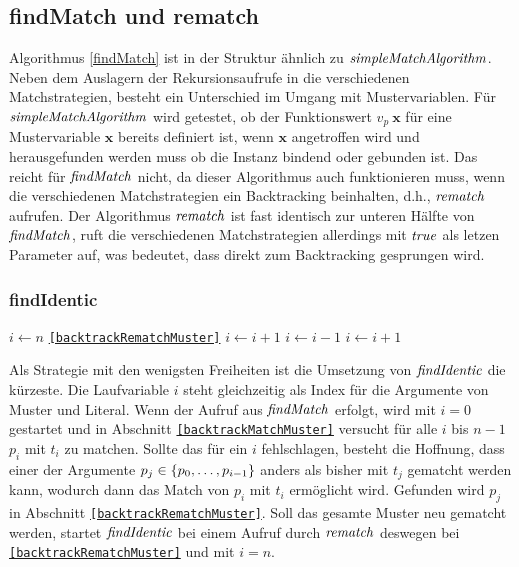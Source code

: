 \subsection{findMatch und rematch}
Algorithmus \ref{findMatch} ist in der Struktur ähnlich zu $\mathit{simpleMatchAlgorithm}$. Neben dem Auslagern der Rekursionsaufrufe in die verschiedenen Matchstrategien, besteht ein Unterschied im Umgang mit Mustervariablen. Für $\mathit{simpleMatchAlgorithm}$ wird getestet, ob der Funktionswert $v_p~\mathbf x$ für eine Mustervariable $\mathbf x$ bereits definiert ist, wenn $\mathbf x$ angetroffen wird und herausgefunden werden muss ob die Instanz bindend oder gebunden ist. Das reicht für $\mathit{findMatch}$ nicht, da dieser Algorithmus auch funktionieren muss, wenn die verschiedenen Matchstrategien ein Backtracking beinhalten, d.h., $\mathit{rematch}$ aufrufen.
Der Algorithmus $\mathit{rematch}$ ist fast identisch zur unteren Hälfte von $\mathit{findMatch}$, ruft die verschiedenen Matchstrategien allerdings mit $\mathit{true}$ als letzen Parameter auf, was bedeutet, dass direkt zum Backtracking gesprungen wird.



\subsubsection {findIdentic}
\begin{algorithm}
\DontPrintSemicolon
\caption{$\Const{findIdentic} \colon M \times T \times \mathit{Bool} \rightarrow \mathit{Bool}$}\label{findIdentic}
\;
 {
	$i \leftarrow n$\;
	\Goto \texttt{\ref{backtrackRematchMuster}}\;
}
\Loop {} {
	 \label{backtrackMatchMuster}
	 {
		$i \leftarrow i + 1$\;
		 {}    
	}
	 \label{backtrackRematchMuster}
	 { 
		 {}
		$i \leftarrow i - 1$\;
	}    
	$i \leftarrow i + 1$\;
}
\end{algorithm}


Als Strategie mit den wenigsten Freiheiten ist die Umsetzung von $\mathit{findIdentic}$ die kürzeste. Die Laufvariable $i$ steht gleichzeitig als Index für die Argumente von Muster und Literal. Wenn der Aufruf aus $\mathit{findMatch}$ erfolgt, wird mit $i = 0$ gestartet und in Abschnitt \texttt{\ref{backtrackMatchMuster}} versucht für alle $i$ bis $n-1$ $p_i$ mit $t_i$ zu matchen. Sollte das  für ein $i$ fehlschlagen, besteht die Hoffnung, dass einer der Argumente $p_j \in \{{p}_{0}, \dots, {p}_{i-1}\}$ anders als bisher mit $t_j$ gematcht werden kann, wodurch dann das Match von $p_i$ mit $t_i$ ermöglicht wird. Gefunden wird $p_j$ in Abschnitt \texttt{\ref{backtrackRematchMuster}}. 
Soll das gesamte Muster neu gematcht werden, startet $\mathit{findIdentic}$ bei einem Aufruf durch $\mathit{rematch}$ deswegen bei \texttt{\ref{backtrackRematchMuster}} und mit $i = n$.

